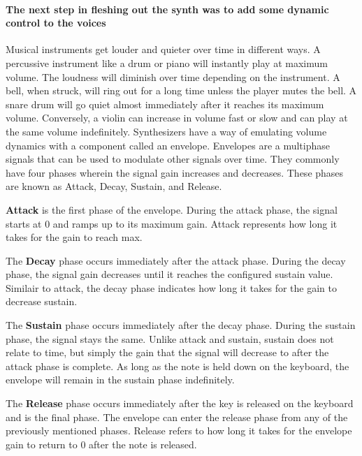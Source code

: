 \documentclass[acmlarge,screen]{acmart}
\begin{document}
	\paragraph{The next step in fleshing out the synth was to add some dynamic control to the voices} Musical instruments get louder and quieter over time in different ways. A percussive instrument like a drum or piano will instantly play at maximum volume. The loudness will diminish over time depending on the instrument. A bell, when struck, will ring out for a long time unless the player mutes the bell. A snare drum will go quiet almost immediately after it reaches its maximum volume. Conversely, a violin can increase in volume fast or slow and can play at the same volume indefinitely. Synthesizers have a way of emulating volume dynamics with a component called an envelope. Envelopes are a multiphase signals that can be used to modulate other signals over time. They commonly have four phases wherein the signal gain increases and decreases. These phases are known as Attack, Decay, Sustain, and Release.
	
	\textbf{Attack} is the first phase of the envelope. During the attack phase, the signal starts at 0 and ramps up to its maximum gain. Attack represents how long it takes for the gain to reach max.

	The \textbf{Decay} phase occurs immediately after the attack phase. During the decay phase, the signal gain decreases until it reaches the configured sustain value. Similair to attack, the decay phase indicates how long it takes for the gain to decrease sustain.

	The \textbf{Sustain} phase occurs immediately after the decay phase. During the sustain phase, the signal stays the same. Unlike attack and sustain, sustain does not relate to time, but simply the gain that the signal will decrease to after the attack phase is complete. As long as the note is held down on the keyboard, the envelope will remain in the sustain phase indefinitely.

	The \textbf{Release} phase occurs immediately after the key is released on the keyboard and is the final phase. The envelope can enter the release phase from any of the previously mentioned phases. Release refers to how long it takes for the envelope gain to return to 0 after the note is released.
\end{document}
